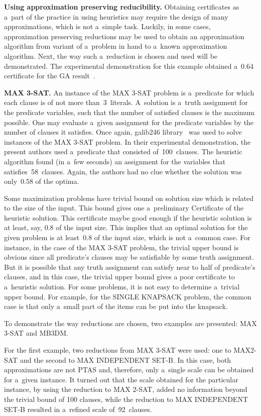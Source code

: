 \begin{multicols}{2}
\noindent
\textbf{Using approximation preserving reducibility.}
Obtaining certificates as a~part of the practice in using heuristics
may require the design of many approximations, which is not a~simple
task. Luckily, in some cases, approximation preserving reductions
may be used to obtain an approximation algorithm from variant of a~problem in hand to a~known approximation algorithm. Next,
the way such a~reduction is chosen and used will be demonstrated. The
experimental demonstration for this example obtained a~0.64
certificate for the {GA} result~\cite{link-to-the-sofware-cite}.

\noindent
\textbf{MAX 3-SAT.} An instance of the {MAX 3-SAT}
problem is a~predicate for which each clause is of not more than~3~literals.
A~solution is a~truth assignment for the predicate
variables, such that the number of satisfied clauses is the maximum
possible. One may evaluate a~given assignment for the predicate
variables by the number of clauses it satisfies. Once again,
 galib246 library~\cite{GAlib} was used to solve instances of the {MAX
3-SAT} problem. In their experimental demonstration, the present authors
used a~predicate that consisted of~100~clauses. The heuristic algorithm found
(in a~few seconds) an assignment for the variables that satisfies~58~clauses.
Again, the authors had no clue whether the solution was only~0.58
of the optima.

Some maximization problems have trivial bound on solution size which
is related to the size of the input. This bound gives one a~preliminary Certificate of the heuristic solution. This certificate
maybe good enough if the heuristic solution is at least, say, 0.8
of the input size. This implies that an optimal solution for the
given problem is at least~0.8 of the input size, which is not a~common case. For instance, in the case of the {MAX 3-SAT}
problem, the trivial upper bound is obvious since all predicate's
clauses may be satisfiable by some truth assignment. But it is
possible that any truth assignment can satisfy near to half of
predicate's clauses, and in this case, the trivial upper bound gives
a poor certificate to a~heuristic solution. For some problems, it is
not easy to determine a~trivial upper bound. For example, for the
{SINGLE KNAPSACK} problem, the common case is that only a~small
part of the items can be put into the knapsack.

To demonstrate the way reductions are chosen,
two examples are presented: {MAX 3-SAT} and {MB3DM}.

For the first example,  two reductions
from {MAX 3-SAT} were used: one to {MAX2-SAT} and the second to
{MAX INDEPENDENT SET-B}. In this case, both approximations are not
{PTAS} and, therefore, only a~single scale can be obtained for
a~given instance. It turned out that the scale obtained for the
particular instance, by using the reduction to {MAX 2-SAT},
added no information beyond the trivial bound of 100 clauses, while
the reduction to {MAX INDEPENDENT SET-B} resulted in a~refined
scale of~92~clauses.


\end{multicols}
